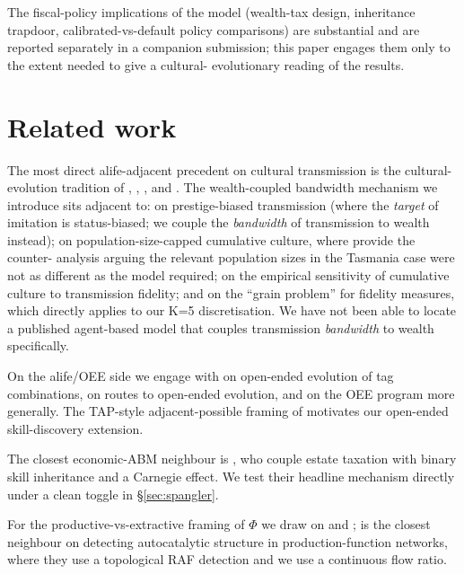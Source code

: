 \documentclass[11pt]{article}
\begin{document}
The fiscal-policy implications of the model (wealth-tax design,
inheritance trapdoor, calibrated-vs-default policy comparisons) are
substantial and are reported separately in a companion submission;
this paper engages them only to the extent needed to give a cultural-
evolutionary reading of the results.

\section{Related work}
\label{sec:related}

The most direct alife-adjacent precedent on cultural transmission is
the cultural-evolution tradition of
\citet{cavallisforza1981cultural}, \citet{boyd1985culture},
\citet{henrich2015secret}, and \citet{lewis2012transmission}.
The wealth-coupled bandwidth mechanism we introduce sits adjacent to:
\citet{henrich2001evolution} on prestige-biased transmission (where
the \emph{target} of imitation is status-biased; we couple
the \emph{bandwidth} of transmission to wealth instead);
\citet{henrich2004demography} on population-size-capped cumulative
culture, where \citet{vaesen2016cumulative} provide the counter-
analysis arguing the relevant population sizes in the Tasmania case
were not as different as the model required;
\citet{lewis2012transmission} on the empirical sensitivity of
cumulative culture to transmission fidelity; and
\citet{charbonneau2021fidelity} on the ``grain problem'' for fidelity
measures, which directly applies to our K=5 discretisation.
We have not been able to locate a published agent-based model that
couples transmission \emph{bandwidth} to wealth specifically.

On the alife/OEE side we engage with \citet{hashimoto2019open} on
open-ended evolution of tag combinations,
\citet{taylor2019evolutionary} on routes to open-ended evolution, and
\citet{banzhaf2016defining} on the OEE program more generally. The
TAP-style adjacent-possible framing of
\citet{hordijk2023emergence} motivates our open-ended skill-discovery
extension.

The closest economic-ABM neighbour is \citet{spangler2022distribution},
who couple estate taxation with binary skill inheritance and a Carnegie
effect. We test their headline mechanism directly under a clean
toggle in \S\ref{sec:spangler}.

For the productive-vs-extractive framing of $\Phi$ we draw on
\citet{kauffman1988evolution} and \citet{mazzucato2018value};
\citet{hordijk2023emergence} is the closest neighbour on detecting
autocatalytic structure in production-function networks, where they
use a topological RAF detection and we use a continuous flow ratio.
\end{document}
